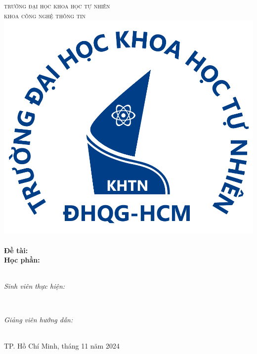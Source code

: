 \begin{titlepage}
\newcommand{\HRule}{\rule{\linewidth}{0.5mm}}


\centering


\textsc{\Large trường đại học khoa học tự nhiên}\\[0.5cm]
\textsc{\Large khoa công nghệ thông tin}\\[1.5cm]
\includegraphics[scale=.13]{img/Logo-TA.png}\\[1cm] 


{ 
\huge{\bfseries{\reporttitle}}\\[0.5cm]
\large{\bfseries{Đề tài: \reportname}}
}\\[0.4cm]

\textbf{\large Học phần: \coursename}\\[0.5cm]

\\[2cm]
\begin{minipage}[t]{0.4\textwidth}
\begin{flushleft} \large
\emph{Sinh viên thực hiện:}\\
\studentname
\end{flushleft}
\end{minipage}
~
\begin{minipage}[t]{0.4\textwidth}
\begin{flushright} \large
\emph{Giảng viên hướng dẫn:} \\
\teachername
\end{flushright}
\end{minipage}\\[4cm]

{\large TP. Hồ Chí Minh, tháng 11 năm 2024}\\[3cm]


\vfill
\end{titlepage}
	